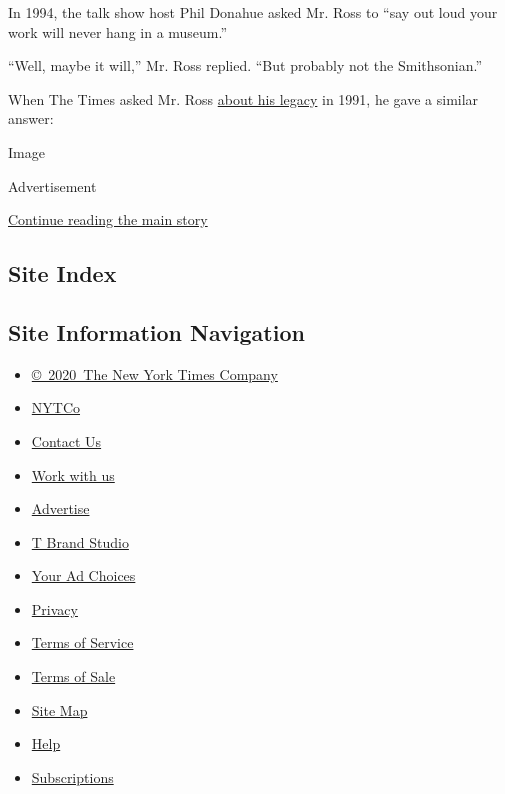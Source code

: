 In 1994, the talk show host Phil Donahue asked Mr. Ross to ``say out
loud your work will never hang in a museum.''

``Well, maybe it will,'' Mr. Ross replied. ``But probably not the
Smithsonian.''

When The Times asked Mr. Ross
\href{https://timesmachine.nytimes3xbfgragh.onion/timesmachine/1991/12/22/128191.html?action=click\&contentCollection=Archives\&module=LedeAsset\&region=ArchiveBody\&pgtype=article\&pageNumber=175}{about
his legacy} in 1991, he gave a similar answer:

Image

Advertisement

\protect\hyperlink{after-bottom}{Continue reading the main story}

\hypertarget{site-index}{%
\subsection{Site Index}\label{site-index}}

\hypertarget{site-information-navigation}{%
\subsection{Site Information
Navigation}\label{site-information-navigation}}

\begin{itemize}
\tightlist
\item
  \href{https://help.nytimes3xbfgragh.onion/hc/en-us/articles/115014792127-Copyright-notice}{©~2020~The
  New York Times Company}
\end{itemize}

\begin{itemize}
\tightlist
\item
  \href{https://www.nytco.com/}{NYTCo}
\item
  \href{https://help.nytimes3xbfgragh.onion/hc/en-us/articles/115015385887-Contact-Us}{Contact
  Us}
\item
  \href{https://www.nytco.com/careers/}{Work with us}
\item
  \href{https://nytmediakit.com/}{Advertise}
\item
  \href{http://www.tbrandstudio.com/}{T Brand Studio}
\item
  \href{https://www.nytimes3xbfgragh.onion/privacy/cookie-policy\#how-do-i-manage-trackers}{Your
  Ad Choices}
\item
  \href{https://www.nytimes3xbfgragh.onion/privacy}{Privacy}
\item
  \href{https://help.nytimes3xbfgragh.onion/hc/en-us/articles/115014893428-Terms-of-service}{Terms
  of Service}
\item
  \href{https://help.nytimes3xbfgragh.onion/hc/en-us/articles/115014893968-Terms-of-sale}{Terms
  of Sale}
\item
  \href{https://spiderbites.nytimes3xbfgragh.onion}{Site Map}
\item
  \href{https://help.nytimes3xbfgragh.onion/hc/en-us}{Help}
\item
  \href{https://www.nytimes3xbfgragh.onion/subscription?campaignId=37WXW}{Subscriptions}
\end{itemize}
